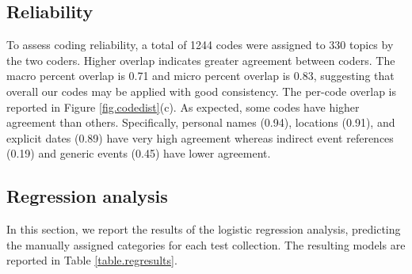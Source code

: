\documentclass[runningheads,a4paper]{llncs}
\begin{document}
\subsection{Reliability}

To assess coding reliability, a total of 1244 codes were assigned to 330 topics by the two coders. Higher overlap indicates greater agreement between coders. The macro percent overlap is 0.71 and  micro percent overlap is 0.83, suggesting that overall our codes may be applied with good consistency. The per-code overlap is reported in Figure \ref{fig.codedist}(c). As expected, some codes have higher agreement than others. Specifically, personal names (0.94), locations (0.91), and explicit dates (0.89) have very high agreement whereas indirect event references (0.19) and generic events (0.45) have lower agreement.



\subsection{Regression analysis}

In this section, we report the results of the logistic regression analysis, predicting the manually assigned categories for each test collection. The resulting models are reported in Table \ref{table.regresults}. 

\begin{table}
\caption{Logistic regression models for each test collection without and with (Rel) ACF/DPS predictors. Model fit reported based pseudo-$R^2$ after stepwise variable selection based on AIC. Variable significance indicated by $p < 0.05 (^\circ),  < 0.01 (^\vartriangle),  < 0.001 (^\blacktriangle)$ }
\label{table.regresults}
\end{table}
\end{document}
